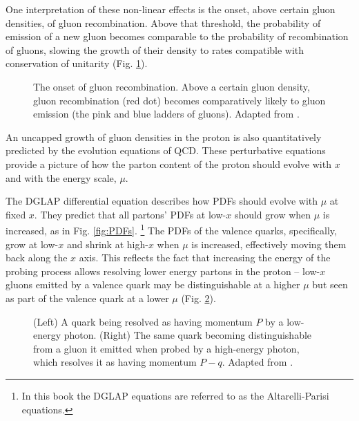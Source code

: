One interpretation of these non-linear effects is the onset, above certain gluon densities, of gluon recombination. Above that threshold, the probability of emission of a new gluon becomes comparable to the probability of recombination of gluons, slowing the growth of their density to rates compatible with conservation of unitarity (Fig. \ref{fig:gluon_recombination}).
\begin{figure}[h]
    \centering
    
    \caption{The onset of gluon recombination. Above a certain gluon density, gluon recombination (red dot) becomes comparatively likely to gluon emission (the pink and blue ladders of gluons). Adapted from \cite{Albacete_2014}.}
    \label{fig:gluon_recombination}
\end{figure}

\medskip
An uncapped growth of gluon densities in the proton is also quantitatively predicted by the evolution equations of \gls{QCD}. These perturbative equations provide a picture of how the parton content of the proton should evolve with $x$ and with the energy scale, $\mu$. %

The \gls{DGLAP} differential equation describes how \glspl{PDF} should evolve with $\mu$ at fixed $x$. They predict that all partons' \glspl{PDF} at low-$x$ should grow when $\mu$ is increased, as in Fig. \ref{fig:PDFs}. \cite{Halzen:1984mc}\footnote{In this book the \gls{DGLAP} equations are referred to as the Altarelli-Parisi equations.} The \glspl{PDF} of the valence quarks, specifically, grow at low-$x$ and shrink at high-$x$ when $\mu$ is increased, effectively moving them back along the $x$ axis. This reflects the fact that increasing the energy of the probing process allows resolving lower energy partons in the proton -- low-$x$ gluons emitted by a valence quark may be distinguishable at a higher $\mu$ but seen as part of the valence quark at a lower $\mu$ (Fig. \ref{fig:DGLAP_resolution}).
\begin{figure}[h]
    \centering
    
    \caption{(Left) A quark being resolved as having momentum $P$ by a low-energy photon. (Right) The same quark becoming distinguishable from a gluon it emitted when probed by a high-energy photon, which resolves it as having momentum $P-q$. Adapted from \cite{Thomson:2013}.}
    \label{fig:DGLAP_resolution}
\end{figure}

